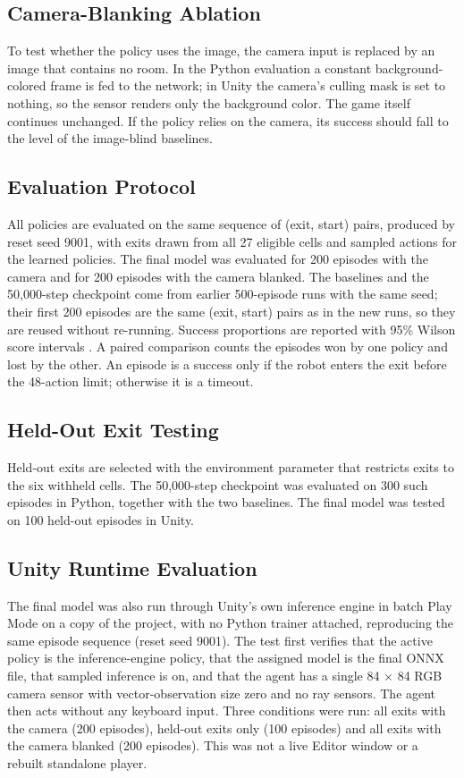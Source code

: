 \documentclass[conference]{IEEEtran}
\begin{document}
\subsection{Camera-Blanking Ablation}
To test whether the policy uses the image, the camera input is replaced by an image that contains no room. In the Python evaluation a constant background-colored frame is fed to the network; in Unity the camera's culling mask is set to nothing, so the sensor renders only the background color. The game itself continues unchanged. If the policy relies on the camera, its success should fall to the level of the image-blind baselines.


\subsection{Evaluation Protocol}
All policies are evaluated on the same sequence of (exit, start) pairs, produced by reset seed 9001, with exits drawn from all 27 eligible cells and sampled actions for the learned policies. The final model was evaluated for 200 episodes with the camera and for 200 episodes with the camera blanked. The baselines and the 50,000-step checkpoint come from earlier 500-episode runs with the same seed; their first 200 episodes are the same (exit, start) pairs as in the new runs, so they are reused without re-running. Success proportions are reported with 95\% Wilson score intervals \cite{wilson1927,brown2001}. A paired comparison counts the episodes won by one policy and lost by the other. An episode is a success only if the robot enters the exit before the 48-action limit; otherwise it is a timeout.


\subsection{Held-Out Exit Testing}
Held-out exits are selected with the environment parameter that restricts exits to the six withheld cells. The 50,000-step checkpoint was evaluated on 300 such episodes in Python, together with the two baselines. The final model was tested on 100 held-out episodes in Unity.


\subsection{Unity Runtime Evaluation}
The final model was also run through Unity's own inference engine in batch Play Mode on a copy of the project, with no Python trainer attached, reproducing the same episode sequence (reset seed 9001). The test first verifies that the active policy is the inference-engine policy, that the assigned model is the final ONNX file, that sampled inference is on, and that the agent has a single 84 $\times$ 84 RGB camera sensor with vector-observation size zero and no ray sensors. The agent then acts without any keyboard input. Three conditions were run: all exits with the camera (200 episodes), held-out exits only (100 episodes) and all exits with the camera blanked (200 episodes). This was not a live Editor window or a rebuilt standalone player.
\end{document}
